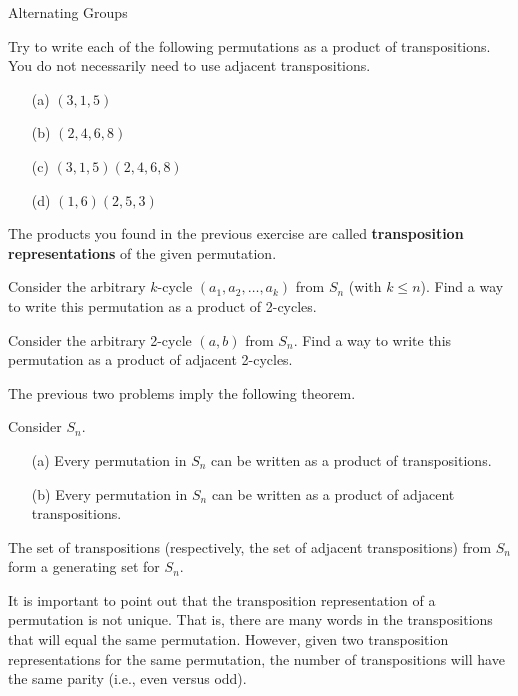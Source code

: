 \begin{section}{Alternating Groups}
\begin{exercise}
Try to write each of the following permutations as a product of transpositions.  You do not necessarily need to use adjacent transpositions.
\begin{enumerate}
\item[(a)] \((3,1,5)\)
\item[(b)] \((2,4,6,8)\)
\item[(c)] \((3,1,5)(2,4,6,8)\)
\item[(d)] \((1,6)(2,5,3)\)
\end{enumerate}
\end{exercise}

The products you found in the previous exercise are called \textbf{transposition representations} of the given permutation.

\begin{problem}
Consider the arbitrary \(k\)-cycle \((a_1,a_2,\ldots, a_k)\) from \(S_n\) (with \(k\leq n\)).  Find a way to write this permutation as a product of 2-cycles. 
\end{problem}

\begin{problem}
Consider the arbitrary 2-cycle \((a,b)\) from \(S_n\).  Find a way to write this permutation as a product of adjacent 2-cycles.
\end{problem}

The previous two problems imply the following theorem.

\begin{theorem}
Consider \(S_n\).
\begin{enumerate}
\item[(a)] Every permutation in \(S_n\) can be written as a product of transpositions.
\item[(b)] Every permutation in \(S_n\) can be written as a product of adjacent transpositions.
\end{enumerate}
\end{theorem}

\begin{corollary}
The set of transpositions (respectively, the set of adjacent transpositions) from \(S_n\) form a generating set for \(S_n\).
\end{corollary}

It is important to point out that the transposition representation of a permutation is not unique.  That is, there are many words in the transpositions that will equal the same permutation.  However, given two transposition representations for the same permutation, the number of transpositions will have the same parity (i.e., even versus odd).


\end{section}
